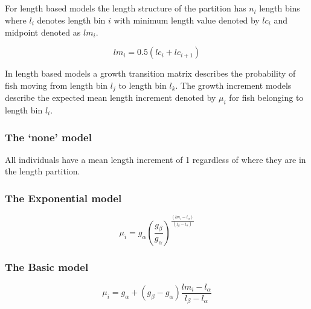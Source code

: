 \subsection{\label{sec:GrowthIncrement}}
For length based models the length structure of the partition has \(n_l\) length bins where \(l_i\) denotes length bin \(i\) with minimum length value denoted by \(lc_i\) and midpoint denoted as \(lm_i\).


\[
lm_i = 0.5 \left(lc_i + lc_{i+1}\right)
\]

In length based models a growth transition matrix describes the probability of fish moving from length bin \(l_j\) to length bin \(l_k\). The growth increment models describe the expected mean length increment denoted by \(\mu_i\) for fish belonging to length bin \(l_i\).



\subsubsection{The `none' model}\label{sec:GrowthIncrement-None}
All individuals have a mean length increment of 1 regardless of where they are in the length partition.

\subsubsection{The Exponential model}\label{sec:GrowthIncrement-Exponential}

\begin{equation}
\mu_i = g_\alpha \left(\frac{g_\beta}{g_\alpha} \right)^{\frac{(lm_i - l_\alpha)}{(l_\beta - l_\alpha)}}
\end{equation}

\subsubsection{The Basic model}\label{sec:GrowthIncrement-Basic}

\begin{equation}
\mu_i = g_\alpha + (g_\beta - g_\alpha) \frac{lm_i - l_\alpha}{l_\beta - l_\alpha}
\end{equation}


